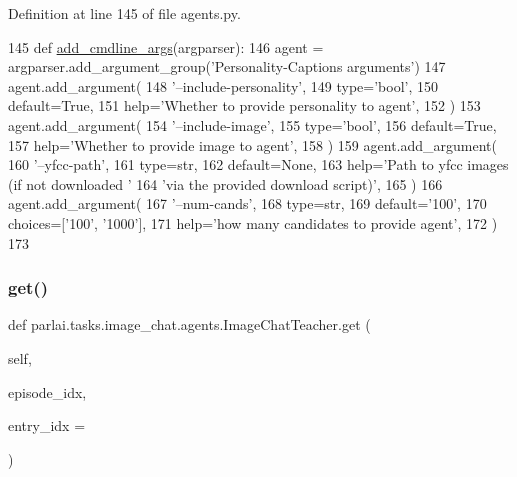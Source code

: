 Definition at line 145 of file agents.\+py.


\begin{DoxyCode}
145     \textcolor{keyword}{def }\hyperlink{namespaceparlai_1_1agents_1_1drqa_1_1config_a62fdd5554f1da6be0cba185271058320}{add\_cmdline\_args}(argparser):
146         agent = argparser.add\_argument\_group(\textcolor{stringliteral}{'Personality-Captions arguments'})
147         agent.add\_argument(
148             \textcolor{stringliteral}{'--include-personality'},
149             type=\textcolor{stringliteral}{'bool'},
150             default=\textcolor{keyword}{True},
151             help=\textcolor{stringliteral}{'Whether to provide personality to agent'},
152         )
153         agent.add\_argument(
154             \textcolor{stringliteral}{'--include-image'},
155             type=\textcolor{stringliteral}{'bool'},
156             default=\textcolor{keyword}{True},
157             help=\textcolor{stringliteral}{'Whether to provide image to agent'},
158         )
159         agent.add\_argument(
160             \textcolor{stringliteral}{'--yfcc-path'},
161             type=str,
162             default=\textcolor{keywordtype}{None},
163             help=\textcolor{stringliteral}{'Path to yfcc images (if not downloaded '}
164             \textcolor{stringliteral}{'via the provided download script)'},
165         )
166         agent.add\_argument(
167             \textcolor{stringliteral}{'--num-cands'},
168             type=str,
169             default=\textcolor{stringliteral}{'100'},
170             choices=[\textcolor{stringliteral}{'100'}, \textcolor{stringliteral}{'1000'}],
171             help=\textcolor{stringliteral}{'how many candidates to provide agent'},
172         )
173 
\end{DoxyCode}
\mbox{\label{classparlai_1_1tasks_1_1image__chat_1_1agents_1_1ImageChatTeacher_ac7212c1001ab9c5027ae305ffdc9298f}} 
\subsubsection{\texorpdfstring{get()}{get()}}
{\footnotesize\ttfamily def parlai.\+tasks.\+image\+\_\+chat.\+agents.\+Image\+Chat\+Teacher.\+get (\begin{DoxyParamCaption}\item[{}]{self,  }\item[{}]{episode\+\_\+idx,  }\item[{}]{entry\+\_\+idx = {} }\end{DoxyParamCaption})}



